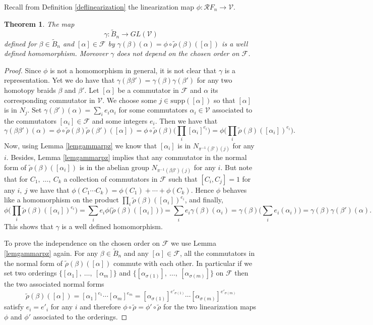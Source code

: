 \documentclass[11pt, a4paper, twoside,reqno]{amsart}
\newtheorem{thm}{Theorem}[section]
\newcommand\supp{\mathord{\mathrm{supp}}}
\begin{document}
Recall from Definition \ref{deflinearization} the linearization map $\phi:\mathcal RF_n\to\mathcal V$.
\begin{thm}\label{thmgammarpz}
The map $$\gamma:\tilde{B}_n\rightarrow GL(\mathcal{V})$$ defined for $\beta\in\tilde B_n$ and $[\alpha]\in\mathcal F$ by $\gamma(\beta)(\alpha)=\phi\circ\tilde\rho(\beta)([\alpha])$
is a well defined homomorphism. Moreover $\gamma$ does not depend on the chosen order on $\mathcal F$.
\end{thm}
\begin{proof}
Since $\phi$ is not a homomorphism in general, it is not clear that $\gamma$ is a representation. Yet we do have that $\gamma(\beta\beta')=\gamma(\beta)\gamma(\beta')$ for any two homotopy braids $\beta$ and $\beta'$.
Let $[\alpha]$ be a commutator in $\mathcal{F}$ and $\alpha$ its corresponding commutator in $\mathcal V$. We choose some $j\in \supp([\alpha])$ so that $[\alpha]$ is in $N_j$. Set $\gamma(\beta')(\alpha)=\sum_ie_i\alpha_i$ for some commutators $\alpha_i\in\mathcal{V}$ associated to the commutators $[\alpha_i]\in\mathcal{F}$ and some integers $e_i$. Then we have that
$$\gamma(\beta\beta')(\alpha)=\phi\circ\tilde\rho(\beta)\tilde\rho(\beta')([\alpha])=\phi\circ\tilde\rho(\beta)\Big(\prod_i[\alpha_i]^{e_i}\Big)=\phi\Big(\prod_i\tilde\rho(\beta)([\alpha_i])^{e_i}\Big).$$ 
Now, using Lemma \ref{lemgammarpz} we know that $[\alpha_i]$ is in $N_{\pi^{-1}(\beta')(j)}$ for any $i$. Besides, Lemma \ref{lemgammarpz} implies that any commutator in the normal form of $\tilde\rho(\beta)([\alpha_i])$ is in the abelian group $N_{\pi^{-1}(\beta\beta')(j)}$ for any $i$. But note that for $C_1,\ \ldots,\ C_k$ a collection of commutators in $\mathcal{F}$ such that $[C_i,C_j]=1$ for any $i,\ j$ we have that $\phi(C_1\cdots C_k)=\phi(C_1)+\cdots+\phi(C_k)$. Hence $\phi$ behaves like a homomorphism on the product $\prod_i\tilde\rho(\beta)([\alpha_i])^{e_i}$, and finally, $$\phi\Big(\prod_i\tilde\rho(\beta)([\alpha_i])^{e_i}\Big)=\sum_ie_i\phi\Big(\tilde\rho(\beta)([\alpha_i])\Big)=\sum_ie_i\gamma(\beta)(\alpha_i)=\gamma(\beta)\Big(\sum_i e_i(\alpha_i)\Big)=\gamma(\beta)\gamma(\beta')(\alpha).$$ This shows that $\gamma$ is a well defined homomorphism.

To prove the independence  on the chosen order on $\mathcal F$ we use Lemma \ref{lemgammarpz} again. For any $\beta\in\tilde B_n$ and any $[\alpha]\in\mathcal F$, all the commutators in the normal form of $\tilde\rho(\beta)([\alpha])$ commute with each other. In particular if we set two orderings $\{[\alpha_1],\ \ldots,\ [\alpha_m]\}$ and $\{[\alpha_{\sigma(1)}],\ \ldots,\ [\alpha_{\sigma(m)}]\}$ on $\mathcal F$ then the two associated normal forms $$\tilde\rho(\beta)([\alpha])=[\alpha_1]^{e_1}\cdots [\alpha_m]^{e_m}=[\alpha_{\sigma(1)}]^{e'_{\sigma(1)}}\cdots [\alpha_{\sigma(m)}]^{e'_{\sigma(m)}}$$ satisfy $e_i=e'_i$ for any $i$ and therefore $\phi\circ\tilde\rho=\phi'\circ\tilde\rho$ for the two linearization maps $\phi$ and $\phi'$ associated to the orderings.
\end{proof}
\end{document}
